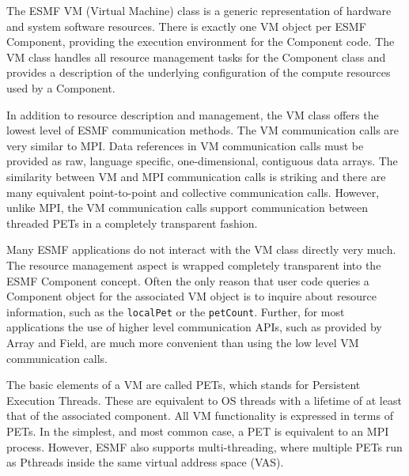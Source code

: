 %

The ESMF VM (Virtual Machine) class is a generic representation of hardware and system software resources. There is exactly one VM object per ESMF Component, providing the execution environment for the Component code. The VM class handles all resource management tasks for the Component class and provides a description of the underlying configuration of the compute resources used by a Component.

In addition to resource description and management, the VM class offers the lowest level of ESMF communication methods. The VM communication calls are very similar to MPI. Data references in VM communication calls must be provided as raw, language specific, one-dimensional, contiguous data arrays. The similarity between VM and MPI communication calls is striking and there are many equivalent point-to-point and collective communication calls. However, unlike MPI, the VM communication calls support communication between threaded PETs in a completely transparent fashion.

Many ESMF applications do not interact with the VM class directly very much. The  resource management aspect is wrapped completely transparent into the ESMF Component concept. Often the only reason that user code queries a Component
object for the associated VM object is to inquire about resource information, such as the {\tt localPet} or the {\tt petCount}. Further, for most applications the use of higher level communication APIs, such as provided by Array and Field, are much more convenient than using the low level VM communication calls.

The basic elements of a VM are called PETs, which stands for Persistent Execution Threads. These are equivalent to OS threads with a lifetime of at least that of the associated component. All VM functionality is expressed in terms of PETs. In the simplest, and most common case, a PET is equivalent to an MPI process. However, ESMF also supports multi-threading, where multiple PETs run as Pthreads inside the same virtual address space (VAS).

